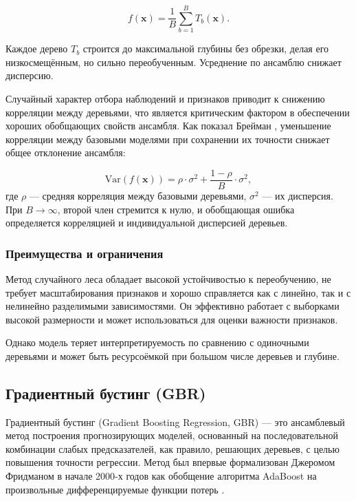 \begin{equation}
f(\mathbf{x}) = \frac{1}{B} \sum_{b=1}^B T_b(\mathbf{x}).
\end{equation}

Каждое дерево $T_b$ строится до максимальной глубины без обрезки, делая его низкосмещённым, но сильно переобученным. Усреднение по ансамблю снижает дисперсию.

Случайный характер отбора наблюдений и признаков приводит к снижению корреляции между деревьями, что является критическим фактором в обеспечении хороших обобщающих свойств ансамбля. Как показал Брейман \cite{Breiman2001}, уменьшение корреляции между базовыми моделями при сохранении их точности снижает общее отклонение ансамбля:

\begin{equation}
\text{Var}(f(\mathbf{x})) = \rho \cdot \sigma^2 + \frac{1 - \rho}{B} \cdot \sigma^2,
\end{equation}
где $\rho$ — средняя корреляция между базовыми деревьями, $\sigma^2$ — их дисперсия. При $B \to \infty$, второй член стремится к нулю, и обобщающая ошибка определяется корреляцией и индивидуальной дисперсией деревьев.

\subsubsection{Преимущества и ограничения}

Метод случайного леса обладает высокой устойчивостью к переобучению, не требует масштабирования признаков и хорошо справляется как с линейно, так и с нелинейно разделимыми зависимостями. Он эффективно работает с выборками высокой размерности и может использоваться для оценки важности признаков.

Однако модель теряет интерпретируемость по сравнению с одиночными деревьями и может быть ресурсоёмкой при большом числе деревьев и глубине.

\subsection{Градиентный бустинг (GBR)} \label{ch1:methods:gbr}

Градиентный бустинг (Gradient Boosting Regression, GBR) --- это ансамблевый метод построения прогнозирующих моделей, основанный на последовательной комбинации слабых предсказателей, как правило, решающих деревьев, с целью повышения точности регрессии. Метод был впервые формализован Джеромом Фридманом в начале 2000-х годов как обобщение алгоритма AdaBoost на произвольные дифференцируемые функции потерь \cite{friedman2001}.

